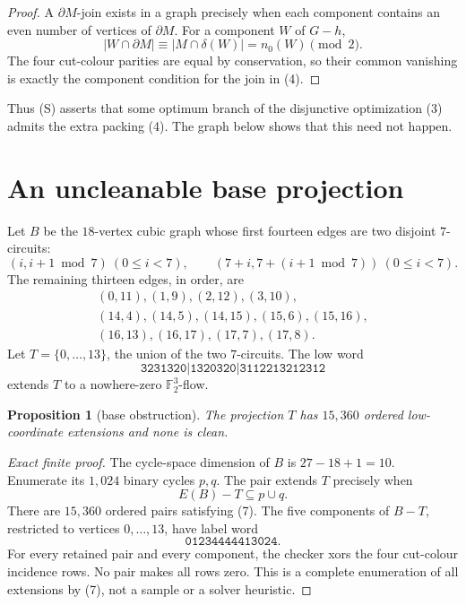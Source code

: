 \documentclass[11pt]{article}
\newtheorem{proposition}[theorem]{Proposition}
\theoremstyle{definition}
\theoremstyle{remark}
\newcommand{\F}{\mathbb F}
\newcommand{\bd}{\partial}
\begin{document}
\begin{proof}
A \(\bd M\)-join exists in a graph precisely when each component
contains an even number of vertices of \(\bd M\).  For a component
\(W\) of \(G-h\),
\[
 |W\cap\bd M|\equiv|M\cap\delta(W)|=n_0(W)\pmod2.
\]
The four cut-colour parities are equal by conservation, so their common
vanishing is exactly the component condition for the join in (4).
\end{proof}

Thus (S) asserts that some optimum branch of the disjunctive
optimization (3) admits the extra packing (4).  The graph below shows
that this need not happen.

\section{An uncleanable base projection}

Let \(B\) be the \(18\)-vertex cubic graph whose first fourteen edges
are two disjoint \(7\)-circuits:
\[
 (i,i+1\bmod7)\ (0\le i<7),\qquad
 (7+i,7+(i+1\bmod7))\ (0\le i<7).
\]
The remaining thirteen edges, in order, are
\[
\begin{gathered}
(0,11),(1,9),(2,12),(3,10),\\
(14,4),(14,5),(14,15),(15,6),(15,16),\\
(16,13),(16,17),(17,7),(17,8).
\end{gathered}                                             \tag{5}
\]
Let \(T=\{0,\ldots,13\}\), the union of the two \(7\)-circuits.
The low word
\[
             \texttt{3231320|1320320|3112213212312}       \tag{6}
\]
extends \(T\) to a nowhere-zero \(\F_2^3\)-flow.

\begin{proposition}[base obstruction]\label{prop:base}
The projection \(T\) has \(15{,}360\) ordered low-coordinate extensions
and none is clean.
\end{proposition}

\begin{proof}[Exact finite proof]
The cycle-space dimension of \(B\) is
\(27-18+1=10\).  Enumerate its \(1{,}024\) binary cycles \(p,q\).
The pair extends \(T\) precisely when
\[
                         E(B)-T\subseteq p\cup q.          \tag{7}
\]
There are \(15{,}360\) ordered pairs satisfying (7).  The five
components of \(B-T\), restricted to vertices \(0,\ldots,13\), have
label word
\[
                         \texttt{01234444413024}.          \tag{8}
\]
For every retained pair and every component, the checker xors the four
cut-colour incidence rows.  No pair makes all rows zero.  This is a
complete enumeration of all extensions by (7), not a sample or a
solver heuristic.
\end{proof}
\end{document}
